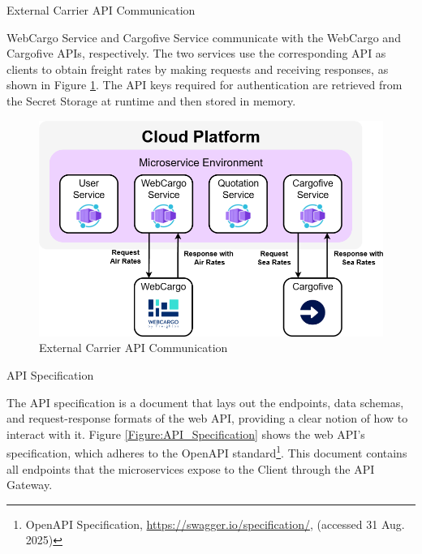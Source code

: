 \documentclass[12pt, reqno]{amsbook}
\makeatletter
\def\section{\@startsection{section}{1}%
      \z@{.5\linespacing\@plus.7\linespacing}{.25\linespacing}%
      {\normalfont\bfseries\flushleft}}
\def\subsection{\@startsection{subsection}{2}%
      \z@{.5\linespacing\@plus.7\linespacing}{.25\linespacing}%
      {\normalfont\bfseries\flushleft}}
\theoremstyle{definition}
\theoremstyle{definition}
\numberwithin{section}{chapter}
\numberwithin{table}{chapter}
\numberwithin{figure}{chapter}
\makeatother
\begin{document}
\subsection{External Carrier API Communication}
\label{Subsection:External_Carrier_API_Communication}

WebCargo Service and Cargofive Service communicate with the WebCargo and Cargofive \acp{API}, respectively. The two services use the corresponding \ac{API} as clients to obtain freight rates by making requests and receiving responses, as shown in Figure \ref{Figure:ExternalCarrierAPICommunication}. The \ac{API} keys required for authentication are retrieved from the Secret Storage at runtime and then stored in memory.

\begin{figure}[H]
  \centering
  \includegraphics[width=0.8\linewidth]{images/ExternalCarrierAPICommunication.png}
  \caption{\label{Figure:ExternalCarrierAPICommunication}External Carrier \ac{API} Communication}
\end{figure}

\section{\texorpdfstring{\ac{API}}{API} Specification}
\label{Section:API_Specification}

The \ac{API} specification is a document that lays out the endpoints, data schemas, and request-response formats of the web \ac{API}, providing a clear notion of how to interact with it. Figure \ref{Figure:API_Specification} shows the web \ac{API}'s specification, which adheres to the OpenAPI standard\footnote{OpenAPI Specification, \url{https://swagger.io/specification/}, (accessed 31 Aug. 2025)}. This document contains all endpoints that the microservices expose to the Client through the \ac{API} Gateway.
\end{document}
